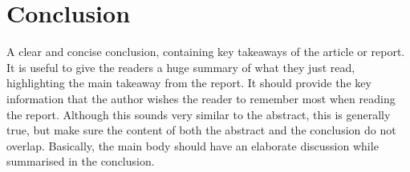 \section{Conclusion}
A clear and concise conclusion, containing key takeaways of the article or report. It is useful to give the readers a huge summary of what they just read, highlighting the main takeaway from the report. It should provide the key information that the author wishes the reader to remember most when reading the report. Although this sounds very similar to the abstract, this is generally true, but make sure the content of both the abstract and the conclusion do not overlap. Basically, the main body should have an elaborate discussion while summarised in the conclusion. 